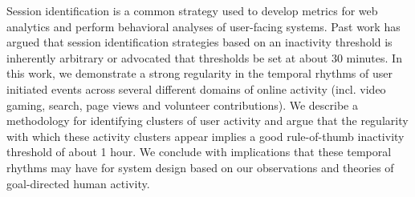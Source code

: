 Session identification is a common strategy used to develop metrics for web analytics and perform behavioral analyses of user-facing systems. Past work has argued that session identification strategies based on an inactivity threshold is inherently arbitrary or advocated that thresholds be set at about 30 minutes. In this work, we demonstrate a strong regularity in the temporal rhythms of user initiated events across several different domains of online activity (incl. video gaming, search, page views and volunteer contributions). We describe a methodology for identifying clusters of user activity and argue that the regularity with which these activity clusters appear implies a good rule-of-thumb inactivity threshold of about 1 hour.  We conclude with implications that these temporal rhythms may have for system design based on our observations and theories of goal-directed human activity.
